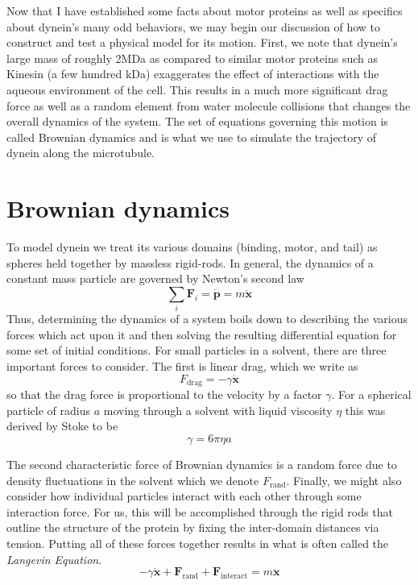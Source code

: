 Now that I have established some facts about motor proteins as well as specifics about dynein's many odd behaviors, we may begin our discussion of how to construct and test a physical model for its motion. First, we note that dynein's large mass of roughly 2MDa \cite{johnson_structure_1983} as compared to similar motor proteins such as Kinesin (a few hundred kDa) \cite{liao_kinesin_1998} exaggerates the effect of interactions with the  aqueous environment of the cell. This results in a much more significant drag force as well as a random element from water molecule collisions that changes the overall dynamics of the system. The set of equations governing this motion is called Brownian dynamics and is what we use to simulate the trajectory of dynein along the microtubule. 
	\section{Brownian dynamics}
	To model dynein we treat its various domains (binding, motor, and tail) as spheres held together by massless rigid-rods. In general, the dynamics of a constant mass particle are governed by Newton's second law
	\begin{equation}
		\sum_i \mathbf{F}_i = \dot{\mathbf{p}} = m\ddot{\mathbf{x}}
	\end{equation}
	Thus, determining the dynamics of a system boils down to describing the various forces which act upon it and then solving the resulting differential equation for some set of initial conditions. For small particles in a solvent, there are three important forces to consider. The first is linear drag, which we write as 
	\begin{equation}
		F_\text{drag} = -\gamma\dot{\mathbf{x}}
	\end{equation}
	so that the drag force is proportional to the velocity by a factor $\gamma$. For a spherical particle of radius $a$ moving through a solvent with liquid viscosity $\eta$ this was derived by Stoke to be 
	\begin{equation}
		\gamma = 6\pi\eta a
	\end{equation}
	
	
	The second characteristic force of Brownian dynamics is a random force due to density fluctuations in the solvent which we denote $F_\text{rand}$. Finally, we might also consider how individual particles interact with each other through some interaction force. For us, this will be accomplished through the rigid rods that outline the structure of the protein by fixing the inter-domain distances via tension. Putting all of these forces together results in what is often called the \textit{Langevin Equation}.
	\begin{equation}
		 -\gamma\dot{\mathbf{x}}+\mathbf{F}_\text{rand} + \mathbf{F}_\text{interact} = m\ddot{\mathbf{x}} 
	\end{equation}
	
